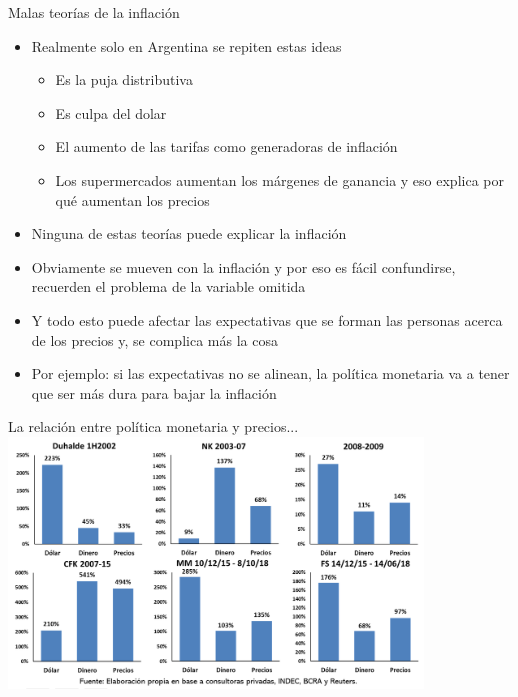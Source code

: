 \documentclass{beamer}
\begin{document}

\begin{frame}{Malas teorías de la inflación}
    \begin{itemize}
        \item Realmente solo en Argentina se repiten estas ideas
            \begin{itemize}
        \item Es la puja distributiva
        \item Es culpa del dolar
        \item El aumento de las tarifas como generadoras de inflación
        \item Los supermercados aumentan los márgenes de ganancia y eso explica por qué aumentan los precios
            \end{itemize}
        \item Ninguna de estas teorías puede explicar la inflación
        \item Obviamente se mueven con la inflación y por eso es fácil confundirse, recuerden el problema de la variable omitida
        \item Y todo esto puede afectar las expectativas que se forman las personas acerca de los precios y, se complica más la cosa
        \item Por ejemplo: si las expectativas no se alinean, la política monetaria va a tener que ser más dura para bajar la inflación
    \end{itemize}
\end{frame}

\begin{frame}{La relación entre política monetaria y precios...}
\centering\includegraphics[width=11cm]{../Figures/P57.png}\
\end{frame}
\end{document}
